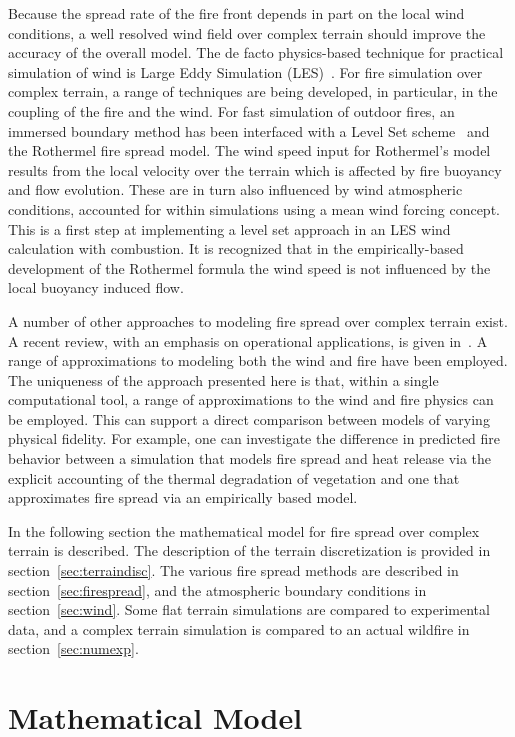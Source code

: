 \documentclass[journal,article,atmosphere,submit,moreauthors,pdftex]{Definitions/mdpi}
\begin{document}
Because the spread rate of the fire front depends in part on the local wind conditions, a well resolved wind field over complex terrain should improve the accuracy of the overall model. The de facto physics-based technique for practical simulation of wind is Large Eddy Simulation (LES)~\cite{Linn:2007,coen_2013,Mell:IJWF2007}. For fire simulation over complex terrain, a range of techniques are being developed, in particular, in the coupling of the fire and the wind. For fast simulation of outdoor fires, an immersed boundary method has been interfaced with a Level Set scheme~\cite{Bova:IJWF2015} and the Rothermel fire spread model. The wind speed input for Rothermel's model results from the local velocity over the terrain which is affected by fire buoyancy and flow evolution. These are in turn also influenced by wind atmospheric conditions, accounted for within simulations using a mean wind forcing concept. This is a first step at implementing a level set approach in an LES wind calculation with combustion. It is recognized that in the empirically-based development of the Rothermel formula the wind speed is not influenced by the local buoyancy induced flow.

A number of other approaches to modeling fire spread over complex terrain exist. A recent review, with an emphasis on operational applications, is given in~\cite{Arca_2019}. A range of approximations to modeling both the wind and fire have been employed. The uniqueness of the approach presented here is that, within a single computational tool, a range of approximations to the wind and fire physics can be employed. This can support a direct comparison between models of varying physical fidelity. For example, one can investigate the difference in predicted fire behavior between a simulation that models fire spread and heat release via the explicit accounting of the thermal degradation of vegetation and one that approximates fire spread via an empirically based model. 

In the following section the mathematical model for fire spread over complex terrain is described. The description of the terrain discretization is provided in section~\ref{sec:terraindisc}. The various fire spread methods are described in section~\ref{sec:firespread}, and the atmospheric boundary conditions in section~\ref{sec:wind}. Some flat terrain simulations are compared to experimental data, and a complex terrain simulation is compared to an actual wildfire in section~\ref{sec:numexp}. 


\section{Mathematical Model} \label{sec:matmodel}
\end{document}
